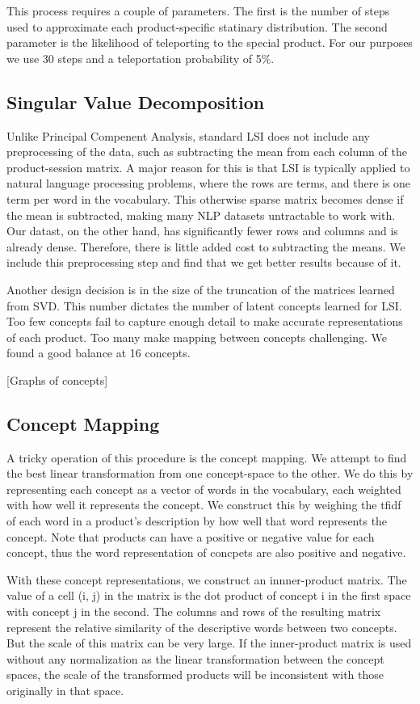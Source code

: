 \documentclass[11pt]{article}
\begin{document}
This process requires a couple of parameters. The first is the number of steps used to
approximate each product-specific statinary distribution. The second parameter
is the likelihood of teleporting to the special product. For our purposes we use
30 steps and a teleportation probability of 5\%.

\subsection*{Singular Value Decomposition}
Unlike Principal Compenent Analysis, standard LSI does not include any
preprocessing of the data, such as subtracting the mean from each column of the
product-session matrix. A major reason for this is that LSI is typically applied
to natural language processing problems, where the rows are terms, and there is
one term per word in the vocabulary. This otherwise sparse matrix becomes dense
if the mean is subtracted, making many NLP datasets untractable to work with. 
Our datast, on the other hand, has significantly fewer rows and columns and is
already dense. Therefore, there is little added cost to subtracting the
means. We include this preprocessing step and find that we get better results
because of it.

Another design decision is in the size of the truncation of the matrices learned
from SVD. This number dictates the number of latent concepts learned for LSI.
Too few concepts fail to capture enough detail to make accurate representations
of each product. Too many make mapping between concepts challenging. We found a
good balance at 16 concepts. 

[Graphs of concepts]

\subsection*{Concept Mapping}
A tricky operation of this procedure is the concept mapping. We attempt to find
the best linear transformation from one concept-space to the other. We do this
by representing each concept as a vector of words in the vocabulary, each
weighted with how well it represents the concept. We construct this by weighing
the tfidf of each word in a product's description by how well that word
represents the concept. Note that products can have a positive or negative value
for each concept, thus the word representation of concpets are also positive and
negative. 

With these concept representations, we construct an innner-product matrix. The 
value of a cell (i, j) in the matrix is the dot product of concept i in the first 
space with concept j in the second. The columns and rows of the resulting matrix
represent the relative similarity of the descriptive words between two concepts.
But the scale of this matrix can be very large. If the inner-product matrix is
used without any normalization as the linear transformation between the concept
spaces, the scale of the transformed products will be inconsistent with those
originally in that space. 
\end{document}
